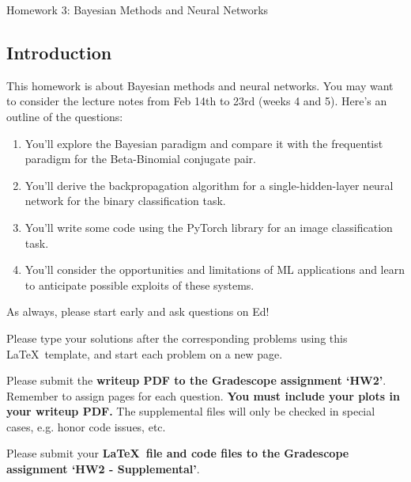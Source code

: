 \documentclass[submit]{harvardml}
\begin{document}
\begin{center}
{\Large Homework 3: Bayesian Methods and Neural Networks}\\
\end{center}

\subsection*{Introduction}

This homework is about Bayesian methods and neural networks. You may want to consider the lecture notes from Feb 14th to 23rd (weeks 4 and 5). Here's an outline of the questions:

\begin{enumerate}
  \item You'll explore the Bayesian paradigm and compare it with the frequentist paradigm for the Beta-Binomial conjugate pair.
  \item You'll derive the backpropagation algorithm for a single-hidden-layer neural network for the binary classification task.
  \item You'll write some code using the PyTorch library for an image classification task.
  \item You'll consider the opportunities and limitations of ML applications and learn to anticipate possible exploits of these systems.
\end{enumerate}

As always, please start early and ask questions on Ed!

Please type your solutions after the corresponding problems using this
\LaTeX\ template, and start each problem on a new page.

Please submit the \textbf{writeup PDF to the Gradescope assignment `HW2'}. Remember to assign pages for each question.  \textbf{You must include your plots in your writeup PDF. } The supplemental files will only be checked in special cases, e.g. honor code issues, etc.

Please submit your \textbf{\LaTeX\ file and code files to the Gradescope assignment `HW2 - Supplemental'}. \\


\newpage

\end{document}
